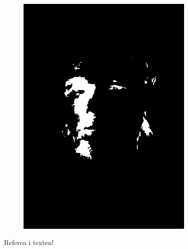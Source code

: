 \begin{figure}[H]
\begin{subfigure}{.16\textwidth}
  \includegraphics[width=0.95\textwidth]{img/fd3/grayFaceSpecialEyeCandidates.png}
  \caption{}
\end{subfigure}%

\caption{Referea i texten!}
\label{fig:grayFace}
\end{figure}